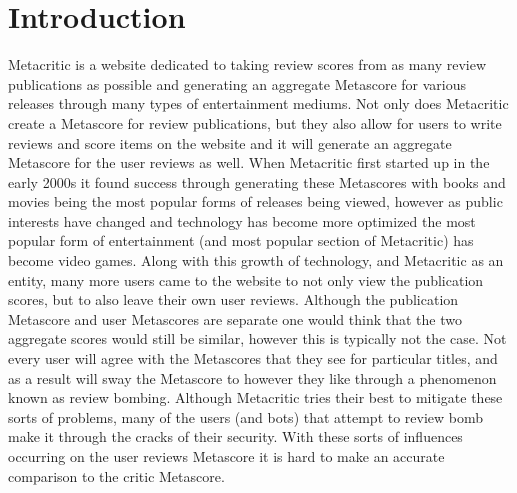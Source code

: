 \documentclass{article}
\begin{document}
\section{Introduction}
\hspace{\parindent} Metacritic is a website dedicated to taking review scores from as many review publications as possible and generating an aggregate Metascore for various releases through many types of entertainment mediums. Not only does Metacritic create a Metascore for review publications, but they also allow for users to write reviews and score items on the website and it will generate an aggregate Metascore for the user reviews as well. When Metacritic first started up in the early 2000s it found success through generating these Metascores with books and movies being the most popular forms of releases being viewed, however as public interests have changed and technology has become more optimized the most popular form of entertainment (and most popular section of Metacritic) has become video games. Along with this growth of technology, and Metacritic as an entity, many more users came to the website to not only view the publication scores, but to also leave their own user reviews. Although the publication Metascore and user Metascores are separate one would think that the two aggregate scores would still be similar, however this is typically not the case. Not every user will agree with the Metascores that they see for particular titles, and as a result will sway the Metascore to however they like through a phenomenon known as review bombing. Although Metacritic tries their best to mitigate these sorts of problems, many of the users (and bots) that attempt to review bomb make it through the cracks of their security. With these sorts of influences occurring on the user reviews Metascore it is hard to make an accurate comparison to the critic Metascore.\\
\end{document}
